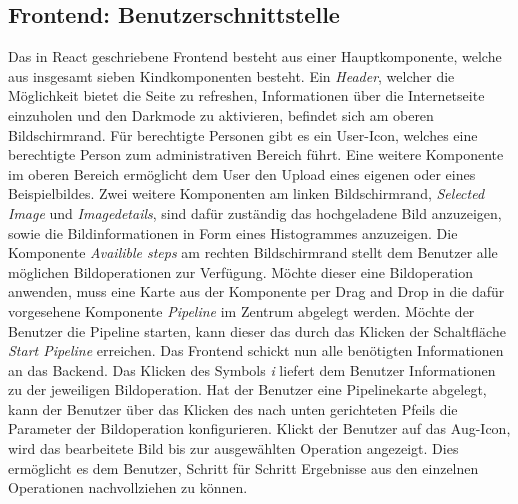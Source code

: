 \subsection{Frontend: Benutzerschnittstelle}
Das in React geschriebene Frontend besteht aus einer Hauptkomponente, welche aus insgesamt sieben Kindkomponenten besteht.
Ein \textit{Header}, welcher die Möglichkeit bietet die Seite zu refreshen, Informationen über die Internetseite einzuholen und den Darkmode zu aktivieren, befindet sich am oberen Bildschirmrand.
Für berechtigte Personen gibt es ein User-Icon, welches eine berechtigte Person zum administrativen Bereich führt.
Eine weitere Komponente im oberen Bereich ermöglicht dem User den Upload eines eigenen oder eines Beispielbildes.
Zwei weitere Komponenten am linken Bildschirmrand, \textit{Selected Image} und \textit{Imagedetails}, sind dafür zuständig das hochgeladene Bild anzuzeigen, sowie die Bildinformationen in Form eines Histogrammes anzuzeigen.
Die Komponente \textit{Availible steps} am rechten Bildschirmrand stellt dem Benutzer alle möglichen Bildoperationen zur Verfügung.
Möchte dieser eine Bildoperation anwenden, muss eine Karte aus der Komponente per Drag and Drop in die dafür vorgesehene Komponente \textit{Pipeline} im Zentrum abgelegt werden.
Möchte der Benutzer die Pipeline starten, kann dieser das durch das Klicken der Schaltfläche \textit{Start Pipeline} erreichen.
Das Frontend schickt nun alle benötigten Informationen an das Backend.
Das Klicken des Symbols \textit{i} liefert dem Benutzer Informationen zu der jeweiligen Bildoperation.
Hat der Benutzer eine Pipelinekarte abgelegt, kann der Benutzer über das Klicken des nach unten gerichteten Pfeils die Parameter der Bildoperation konfigurieren.
Klickt der Benutzer auf das Aug-Icon, wird das bearbeitete Bild bis zur ausgewählten Operation angezeigt.
Dies ermöglicht es dem Benutzer, Schritt für Schritt Ergebnisse aus den einzelnen Operationen nachvollziehen zu können.